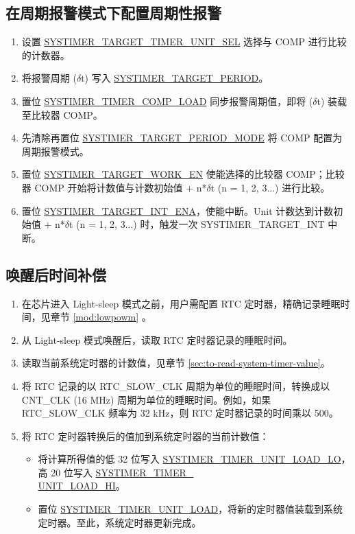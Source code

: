 \documentclass[main\_\_CN.tex]{subfiles}
\begin{document}
\subsection{在周期报警模式下配置周期性报警}
\begin{enumerate}
    \item 设置 \hyperref[fielddesc:SYSTIMERTARGET0TIMERUNITSEL]{SYSTIMER\_TARGET\_TIMER\_UNIT\_SEL} 选择与 COMP 进行比较的计数器。
    \item 将报警周期 ($\delta$t) 写入 \hyperref[fielddesc:SYSTIMERTARGET0PERIOD]{SYSTIMER\_TARGET\_PERIOD}。
    \item 置位 \hyperref[fielddesc:SYSTIMERTIMERCOMP0LOAD]{SYSTIMER\_TIMER\_COMP\_LOAD} 同步报警周期值，即将 ($\delta$t) 装载至比较器 COMP。
    \item 先清除再置位 \hyperref[fielddesc:SYSTIMERTARGET0PERIODMODE]{SYSTIMER\_TARGET\_PERIOD\_MODE} 将 COMP 配置为周期报警模式。
    \item 置位 \hyperref[fielddesc:SYSTIMERTARGET0WORKEN]{SYSTIMER\_TARGET\_WORK\_EN} 使能选择的比较器 COMP；比较器 COMP 开始将计数值与计数初始值 + n*$\delta$t (n = 1, 2, 3...) 进行比较。
    \item 置位 \hyperref[fielddesc:SYSTIMERTARGET0INTENA]{SYSTIMER\_TARGET\_INT\_ENA}，使能中断。Unit 计数达到计数初始值 + n*$\delta$t (n = 1, 2, 3...) 时，触发一次 SYSTIMER\_TARGET\_INT 中断。
\end{enumerate}


\subsection{唤醒后时间补偿}
\begin{enumerate}
    \item 在芯片进入 Light-sleep 模式之前，用户需配置 RTC 定时器，精确记录睡眠时间，见章节 \ref{mod:lowpowm} \textit{}。
    \item 从 Light-sleep 模式唤醒后，读取 RTC 定时器记录的睡眠时间。
    \item 读取当前系统定时器的计数值，见章节  \ref{sec:to-read-system-timer-value}。
    \item 将 RTC 记录的以 RTC\_SLOW\_CLK 周期为单位的睡眠时间，转换成以 CNT\_CLK (16 MHz) 周期为单位的睡眠时间。例如，如果 RTC\_SLOW\_CLK 频率为 32 kHz，则 RTC 定时器记录的时间乘以 500。
    \item 将 RTC 定时器转换后的值加到系统定时器的当前计数值：
    \begin{itemize}
        \item 将计算所得值的低 32 位写入 \hyperref[fielddesc:SYSTIMERTIMERUNIT0LOADLO]{SYSTIMER\_TIMER\_UNIT\_LOAD\_LO}，高 20 位写入 \hyperref[fielddesc:SYSTIMERTIMERUNIT0LOADHI]{SYSTIMER\_TIMER\_\\UNIT{}\_LOAD\_HI}。
        \item 置位 \hyperref[fielddesc:SYSTIMERTIMERUNIT0LOAD]{SYSTIMER\_TIMER\_UNIT\_LOAD}，将新的定时器值装载到系统定时器。至此，系统定时器更新完成。
        \end{itemize}
\end{enumerate}
\end{document}
